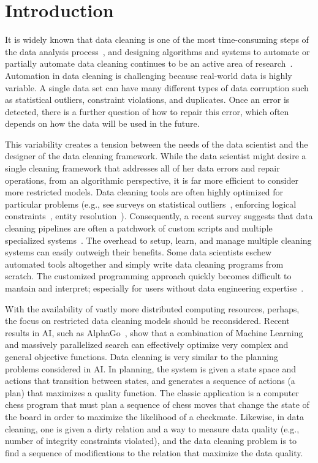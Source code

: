 \section{Introduction}\label{intro}\sloppy
It is widely known that data cleaning is one of the most time-consuming steps of the data analysis process~\cite{nytimes}, and
designing algorithms and systems to automate or partially automate data cleaning continues to be an active area of research~\cite{DBLP:conf/sigmod/ChuIKW16}.
Automation in data cleaning is challenging because real-world data is highly variable. 
A single data set can have many different types of data corruption such as statistical outliers, constraint violations, and duplicates.
Once an error is detected, there is a further question of how to repair this error, which often depends on how the data will be used in the future.

This variability creates a tension between the needs of the data scientist and the designer of the data cleaning framework.
While the data scientist might desire a single cleaning framework that addresses all of her data errors and repair operations, from an algorithmic perspective, it is far more efficient to consider more restricted models.
Data cleaning tools are often highly optimized for particular problems  (e.g., see surveys on statistical outliers~\cite{hellerstein2008quantitative}, enforcing logical constraints~\cite{DBLP:conf/sigmod/ChuIKW16}, entity resolution~\cite{DBLP:journals/pvldb/KopckeTR10}). 
Consequently, a recent survey suggests that data cleaning pipelines are often a patchwork of custom scripts and multiple specialized systems~\cite{krishnan2016hilda}.
The overhead to setup, learn, and manage multiple cleaning systems can easily outweigh their benefits.
Some data scientists eschew automated tools altogether and simply write data cleaning programs from scratch.
The customized programming approach quickly becomes difficult to mantain and interpret; especially for users without data engineering expertise~\cite{sculley2014machine}.

With the availability of vastly more distributed computing resources, perhaps, the focus on restricted data cleaning models should be reconsidered.
Recent results in AI, such as AlphaGo~\cite{silver2016mastering}, show that a combination of Machine Learning and massively parallelized search can effectively optimize very complex and general objective functions.
Data cleaning is very similar to the planning problems considered in AI.
In planning, the system is given a state space and actions that transition between states, and generates a sequence of actions (a plan) that maximizes a quality function. The classic application is a computer chess program that must plan a sequence of chess moves that change the state of the board in order to maximize the likelihood of a checkmate. Likewise, in data cleaning, one is given a dirty relation and a way to measure data quality (e.g., number of integrity constraints violated), and the data cleaning problem is to find a sequence of modifications to the relation that maximize the data quality.

